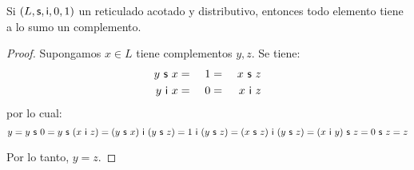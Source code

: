   \begin{lemma}
    \PN Si $(L, \mathsf{s}, \mathsf{i}, 0, 1)$ un reticulado acotado y distributivo, entonces todo elemento tiene a lo sumo un
    complemento.
  \end{lemma}
  \begin{proof}
    \PN Supongamos $x \in L$ tiene complementos $y, z$. Se tiene:
    \begin{alignat*}{3}
      y \ \mathsf{s} \ x &=& \ 1 &=& \ x \ \mathsf{s} \ z \\
      y \ \mathsf{i} \ x &=& \ 0 &=& \ x \ \mathsf{i} \ z
    \end{alignat*}
    \PN por lo cual:
    \[
      y = y \ \SU \ 0 = y \ \SU \ (x \ \IN \ z) = (y \ \SU \ x) \ \IN \ (y \ \SU \ z) = 1 \ \IN \ (y \ \SU \ z) = (x \
      \SU \ z) \ \IN \ (y \ \SU \ z) = (x \ \IN \ y) \ \SU \ z = 0 \ \SU \ z = z
    \]

    \PN Por lo tanto, $y = z$.
  \end{proof}

